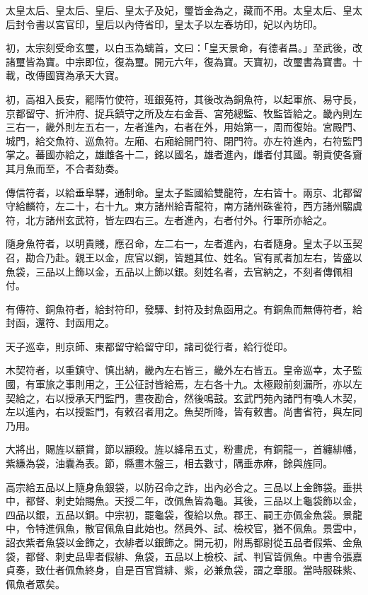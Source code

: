 \begin{pinyinscope}
 太皇太后、皇太后、皇后、皇太子及妃，璽皆金為之，藏而不用。太皇太后、皇太后封令書以宮官印，皇后以內侍省印，皇太子以左春坊印，妃以內坊印。



 初，太宗刻受命玄璽，以白玉為螭首，文曰：「皇天景命，有德者昌。」至武後，改諸璽皆為寶。中宗即位，復為璽。開元六年，復為寶。天寶初，改璽書為寶書。十載，改傳國寶為承天大寶。



 初，高祖入長安，罷隋竹使符，班銀菟符，其後改為銅魚符，以起軍旅、易守長，京都留守、折沖府、捉兵鎮守之所及左右金吾、宮苑總監、牧監皆給之。畿內則左三右一，畿外則左五右一，左者進內，右者在外，用始第一，周而復始。宮殿門、城門，給交魚符、巡魚符。左廂、右廂給開門符、閉門符。亦左符進內，右符監門掌之。蕃國亦給之，雄雌各十二，銘以國名，雄者進內，雌者付其國。朝貢使各齎其月魚而至，不合者劾奏。



 傳信符者，以給垂阜驛，通制命。皇太子監國給雙龍符，左右皆十。兩京、北都留守給麟符，左二十，右十九。東方諸州給青龍符，南方諸州硃雀符，西方諸州騶虞符，北方諸州玄武符，皆左四右三。左者進內，右者付外。行軍所亦給之。



 隨身魚符者，以明貴賤，應召命，左二右一，左者進內，右者隨身。皇太子以玉契召，勘合乃赴。親王以金，庶官以銅，皆題其位、姓名。官有貳者加左右，皆盛以魚袋，三品以上飾以金，五品以上飾以銀。刻姓名者，去官納之，不刻者傳佩相付。



 有傳符、銅魚符者，給封符印，發驛、封符及封魚函用之。有銅魚而無傳符者，給封函，還符、封函用之。



 天子巡幸，則京師、東都留守給留守印，諸司從行者，給行從印。



 木契符者，以重鎮守、慎出納，畿內左右皆三，畿外左右皆五。皇帝巡幸，太子監國，有軍旅之事則用之，王公征討皆給焉，左右各十九。太極殿前刻漏所，亦以左契給之，右以授承天門監門，晝夜勘合，然後鳴鼓。玄武門苑內諸門有喚人木契，左以進內，右以授監門，有敕召者用之。魚契所降，皆有敕書。尚書省符，與左同乃用。



 大將出，賜旌以顓賞，節以顓殺。旌以絳帛五丈，粉畫虎，有銅龍一，首纏緋幡，紫縑為袋，油囊為表。節，縣畫木盤三，相去數寸，隅垂赤麻，餘與旌同。



 高宗給五品以上隨身魚銀袋，以防召命之詐，出內必合之。三品以上金飾袋。垂拱中，都督、刺史始賜魚。天授二年，改佩魚皆為龜。其後，三品以上龜袋飾以金，四品以銀，五品以銅。中宗初，罷龜袋，復給以魚。郡王、嗣王亦佩金魚袋。景龍中，令特進佩魚，散官佩魚自此始也。然員外、試、檢校官，猶不佩魚。景雲中，詔衣紫者魚袋以金飾之，衣緋者以銀飾之。開元初，附馬都尉從五品者假紫、金魚袋，都督、刺史品卑者假緋、魚袋，五品以上檢校、試、判官皆佩魚。中書令張嘉貞奏，致仕者佩魚終身，自是百官賞緋、紫，必兼魚袋，謂之章服。當時服硃紫、佩魚者眾矣。




\end{pinyinscope}
